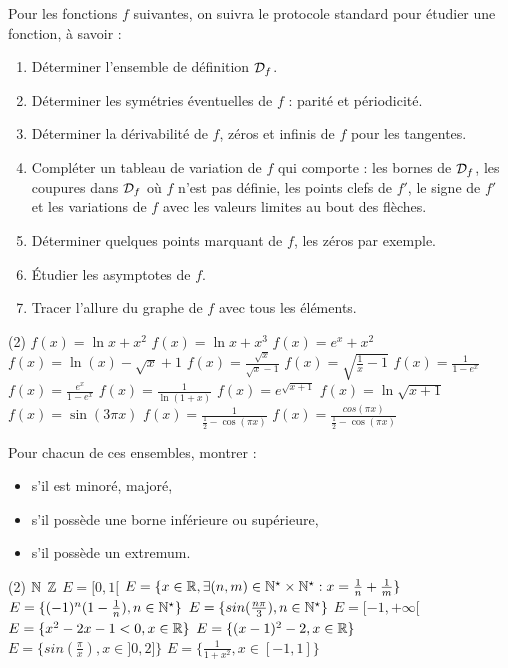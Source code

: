 \begin{exercise}[subtitle= Étude de fonctions, difficulty=*]
Pour les fonctions $f$ suivantes, on suivra le protocole standard pour étudier une fonction, à savoir :
\begin{enumerate}
	\item Déterminer l'ensemble de définition $\mathcal{D}_f$.
	\item Déterminer les symétries éventuelles de $f$ : parité et périodicité.
	\item Déterminer la dérivabilité de $f$,  zéros et infinis de $f$ pour les tangentes.
	\item Compléter un tableau de variation de $f$ qui comporte : les bornes de $\mathcal{D}_f$, les coupures dans $\mathcal{D}_f$ où $f$ n'est pas définie, les points clefs de $f'$, le signe de $f'$ et les variations de $f$ avec les valeurs limites au bout des flèches.
	\item Déterminer quelques points marquant de $f$, les zéros par exemple.
	\item Étudier les asymptotes de $f$.
	\item Tracer l'allure du graphe de $f$ avec tous les éléments.
\end{enumerate}
	\begin{tasks}(2)
		\task $f(x)= \ln{x}+x^2$
		\task $f(x)= \ln{x}+x^3$
		\task $f(x)= e^{x}+x^2$
		\task $f(x)= \ln(x)-\sqrt{x}+1$
		\task $f(x)= \frac{\sqrt{x}}{\sqrt{x}-1}$
		\task $f(x)= \sqrt{\frac{1}{x}-1}$
		\task $f(x)= \frac{1}{1-e^x}$
	    \task $f(x)= \frac{e^x}{1-e^x}$
		\task $f(x)= \frac{1}{\ln(1+x)}$
		\task $f(x)= e^{\sqrt{x+1}}$
	    \task $f(x)= \ln{\sqrt{x+1}}$
	    \task $f(x)= \sin(3 \pi x)$
	    \task $f(x)= \frac{1}{\frac{1}{2}-\cos(\pi x)}$
	    \task $f(x)= \frac{cos(\pi x)}{\frac{1}{2}-\cos(\pi x)}$
	\end{tasks}
\end{exercise}



\begin{exercise}[subtitle= Extrema de fonctions, difficulty=*]
	Pour chacun de ces ensembles, montrer :
	\begin{itemize}
		\item s'il est minoré, majoré,
		\item s'il possède une borne inférieure ou supérieure, 
		\item  s'il possède un extremum.
	\end{itemize}
	\begin{tasks}(2)
		\task $\mathbb{N}$
		\task $\mathbb{Z}$
		\task $E = [0,1[$
		\task $E = \{ x \in \mathbb{R}, \exists (n,m) \in \mathbb{N}^\star \times \mathbb{N}^\star : x=\frac{1}{n} + \frac{1}{m} \}$
		\task $E = \{(-1)^n(1-\frac{1}{n}), n \in \mathbb{N}^\star \}$
		\task $E = \{sin(\frac{n \pi}{3}), n \in \mathbb{N}^\star \}$
		\task $E = [-1,+\infty[$
		\task $E = \{x^2 - 2x -1 <0, x \in \mathbb{R} \}$
		\task $E = \{(x-1)^2-2, x \in \mathbb{R} \}$
	    \task $E = \{sin(\frac{\pi}{x}), x \in ]0,2] \}$
	    \task $E = \{\frac{1}{1+x^2}, x \in [-1,1] \}$
	\end{tasks}
\end{exercise}


